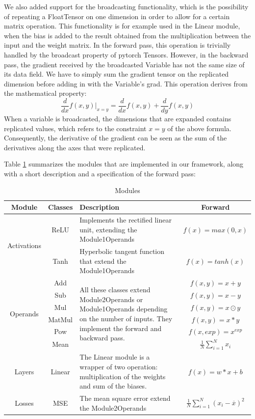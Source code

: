 \documentclass[10pt,conference,compsocconf]{IEEEtran}
\begin{document}
We also added support for the broadcasting functionality, which is the possibility of repeating a FloatTensor on one dimension in order to allow for a certain matrix operation. This functionality is for example used in the Linear module, when the bias is added to the result obtained from the multiplication between the input and the weight matrix. In the forward pass, this operation is trivially handled by the broadcast property of pytorch Tensors. However, in the backward pass, the gradient received by the broadcasted Variable has not the same size of its data field. We have to simply sum the gradient tensor on the replicated dimension before adding in with the Variable's grad. This operation derives from the mathematical property:
\[\frac{d}{dx}f(x,y)|_{x=y} = \frac{d}{dx}f(x,y) + \frac{d}{dy}f(x,y)\]
When a variable is broadcasted, the dimensions that are expanded contains replicated values, which refers to the constraint $x=y$ of the above formula. Consequently, the derivative of the gradient can be seen as the sum of the derivatives along the axes that were replicated.

Table \ref{tab:modules} summarizes the modules that are implemented in our framework, along with a short description and a specification of the forward pass:

\begin{table}
\caption{Modules}
\label{tab:modules}
\begin{tabular}{ | c | c | p{10cm} | c | } 
\hline
Module & Classes & Description & Forward  \\
\hline
\multirow{2}{4em}{Activations} 
& ReLU & Implements the rectified linear unit, extending the Module1Operands & $f(x) = max(0, x)$  \\
& Tanh & Hyperbolic tangent function that extend the Module1Operands & $f(x) = tanh(x)$ \\
\hline
\multirow{6}{4em}{Operands}
& Add & \multirow{6}{30em}{All these classes extend Module2Operands or Module1Operands depending on the number of inputs. They implement the forward and backward pass. } & $f(x, y) = x + y$ \\
& Sub & & $f(x, y) = x - y$ \\ 
& Mul & & $f(x, y) = x \odot y$ \\ 
& MatMul & & $f(x, y) = x * y$ \\ 
& Pow & & $f(x, exp) = x^{exp}$ \\ 
& Mean & & $\frac{1}{N} \sum_{i=1}^N x_i$ \\
\hline
Layers & Linear & The Linear module is a wrapper of two operation: multiplication of the weights and sum of the biases. & $f(x) = w*x + b$ \\ 
\hline
Losses & MSE & The mean square error extend the Module2Operands & $\frac{1}{N} \sum_{i=1}^N (x_i - \overline{x})^2$  \\ 
\hline
\end{tabular}
\end{table}
\end{document}
